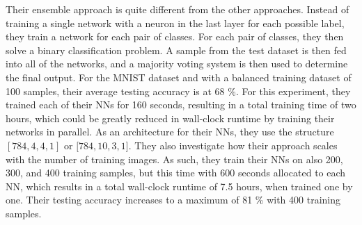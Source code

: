 \noindent Their ensemble approach is quite different from the other approaches. Instead of training a single network with a neuron in the last layer for each possible label, they train a network for each pair of classes. For each pair of classes, they then solve a binary classification problem. A sample from the test dataset is then fed into all of the networks, and a majority voting system is then used to determine the final output. For the MNIST dataset and with a balanced training dataset of 100 samples, their average testing accuracy is at 68 \%. For this experiment, they trained each of their NNs for 160 seconds, resulting in a total training time of two hours, which could be greatly reduced in wall-clock runtime by training their networks in parallel.  As an architecture for their NNs, they use the structure $[784, 4, 4, 1]$ or $[784, 10, 3, 1$]. They also investigate how their approach scales with the number of training images. As such, they train their NNs on also 200, 300, and 400 training samples, but this time with 600 seconds allocated to each NN, which results in a total wall-clock runtime of 7.5 hours, when trained one by one. Their testing accuracy increases to a maximum of 81 \% with 400 training samples. \\


